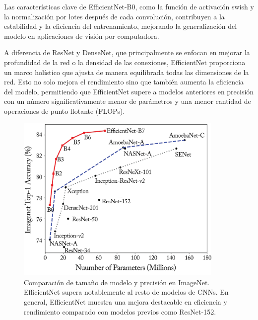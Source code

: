 Las características clave de EfficientNet-B0, como la función de activación swish y la normalización por lotes después de cada convolución, contribuyen a la estabilidad y la eficiencia del entrenamiento, mejorando la generalización del modelo en aplicaciones de visión por computadora.

A diferencia de ResNet y DenseNet, que principalmente se enfocan en mejorar la profundidad de la red o la densidad de las conexiones, EfficientNet proporciona un marco holístico que ajusta de manera equilibrada todas las dimensiones de la red. Esto no solo mejora el rendimiento sino que también aumenta la eficiencia del modelo, permitiendo que EfficientNet supere a modelos anteriores en precisión con un número significativamente menor de parámetros y una menor cantidad de operaciones de punto flotante (FLOPs).

\begin{figure}
	\centering
	\includegraphics[width=100mm]{img/cnn-sota.png}
	\caption{Comparación de tamaño de modelo y precisión en ImageNet. EfficientNet supera notablemente al resto de modelos de CNNs. En general, EfficientNet muestra una mejora destacable en eficiencia y rendimiento comparado con modelos previos como ResNet-152.}
\end{figure}

